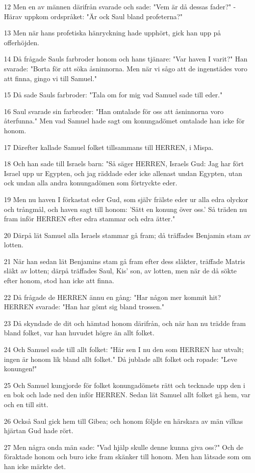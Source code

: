\par 12 Men en av männen därifrån svarade och sade: "Vem är då dessas fader?" - Härav uppkom ordspråket: "Är ock Saul bland profeterna?"
\par 13 Men när hans profetiska hänryckning hade upphört, gick han upp på offerhöjden.
\par 14 Då frågade Sauls farbroder honom och hans tjänare: "Var haven I varit?" Han svarade: "Borta för att söka åsninnorna. Men när vi sågo att de ingenstädes voro att finna, gingo vi till Samuel."
\par 15 Då sade Sauls farbroder: "Tala om for mig vad Samuel sade till eder."
\par 16 Saul svarade sin farbroder: "Han omtalade för oss att åsninnorna voro återfunna." Men vad Samuel hade sagt om konungadömet omtalade han icke för honom.
\par 17 Därefter kallade Samuel folket tillsammans till HERREN, i Mispa.
\par 18 Och han sade till Israels barn: "Så säger HERREN, Israels Gud: Jag har fört Israel upp ur Egypten, och jag räddade eder icke allenast undan Egypten, utan ock undan alla andra konungadömen som förtryckte eder.
\par 19 Men nu haven I förkastat eder Gud, som själv frälste eder ur alla edra olyckor och trångmål, och haven sagt till honom: 'Sätt en konung över oss.' Så träden nu fram inför HERREN efter edra stammar och edra ätter."
\par 20 Därpå lät Samuel alla Israels stammar gå fram; då träffades Benjamin stam av lotten.
\par 21 När han sedan lät Benjamins stam gå fram efter dess släkter, träffade Matris släkt av lotten; därpå träffades Saul, Kis' son, av lotten, men när de då sökte efter honom, stod han icke att finna.
\par 22 Då frågade de HERREN ännu en gång: "Har någon mer kommit hit? HERREN svarade: "Han har gömt sig bland trossen."
\par 23 Då skyndade de dit och hämtad honom därifrån, och när han nu trädde fram bland folket, var han huvudet högre än allt folket.
\par 24 Och Samuel sade till allt folket: "Här sen I nu den som HERREN har utvalt; ingen är honom lik bland allt folket." Då jublade allt folket och ropade: "Leve konungen!"
\par 25 Och Samuel kungjorde för folket konungadömets rätt och tecknade upp den i en bok och lade ned den inför HERREN. Sedan lät Samuel allt folket gå hem, var och en till sitt.
\par 26 Också Saul gick hem till Gibea; och honom följde en härskara av män vilkas hjärtan Gud hade rört.
\par 27 Men några onda män sade: "Vad hjälp skulle denne kunna giva oss?" Och de föraktade honom och buro icke fram skänker till honom. Men han låtsade som om han icke märkte det.

